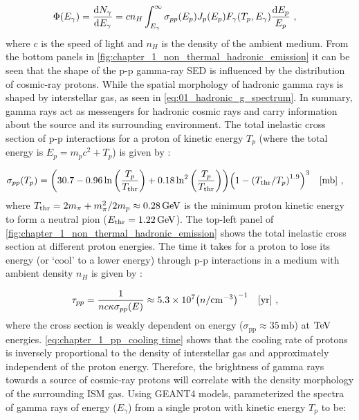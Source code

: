 \begin{equation}
    \begin{aligned}
	\Phi\qty(E_\gamma)&=\dv{N_\gamma}{E_\gamma}=cn_H\int_{E_\gamma}^\infty\sigma_{pp}\qty(E_p)J_p\qty(E_p)F_\gamma\qty(T_p,E_\gamma)\frac{\dd{E_p}}{E_p}\text{ ,}
\end{aligned} \label{eq:01_hadronic_g_spectrum}
\end{equation}
\noindent where $c$ is the speed of light and $n_H$ is the density of the ambient medium.
From the bottom panels in \autoref{fig:chapter_1_non_thermal_hadronic_emission} it can be seen that the shape of the p-p gamma-ray SED is influenced by the distribution of cosmic-ray protons. While the spatial morphology of hadronic gamma rays is shaped by interstellar gas, as seen in \autoref{eq:01_hadronic_g_spectrum}. In summary, gamma rays act as messengers for hadronic cosmic rays and carry information about the source and its surrounding environment.
\newpar
The total inelastic cross section of p-p interactions for a proton of kinetic energy $T_p$ (where the total energy is $E_p=m_pc^2+T_p$) is given by \citep{2014PhRvD..90l3014K}:

\begin{equation}
    \begin{aligned}
    \sigma_{pp}\qty(T_p) &= \qty(30.7-0.96\ln\qty(\frac{T_p}{T_\text{thr}})+0.18\ln^2\qty(\frac{T_p}{T_\text{thr}}))\qty(1-\qty(T_\text{thr}/T_p)^{1.9})^3\quad\qty[\si{\milli\barn}]\text{ ,}
    \end{aligned} \label{eq:chapter1_non_thermal_pp_cross_section}
\end{equation}
\noindent where $T_\text{thr}=2m_\pi + m_\pi^2/2m_p \approx 0.28\,\GeV$ is the minimum proton kinetic energy to form a neutral pion ($E_\text{thr}=1.22\,\GeV$). The top-left panel of \autoref{fig:chapter_1_non_thermal_hadronic_emission} shows the total inelastic cross section at different proton energies.
\newpar
The time it takes for a proton to lose its energy (or `cool' to a lower energy) through p-p interactions in a medium with ambient density $n_H$ is given by \citep{2009ARA&A..47..523H}:

\begin{equation}
    \begin{aligned}
	\tau_{pp} &= \frac{1}{nc\kappa\sigma_{pp}\qty(E)} \approx 5.3\times 10^7\qty(n/\centimeterminusthree)^{-1}\quad\qty[\si{yr}]\text{ ,}
\end{aligned} \label{eq:chapter_1_pp_cooling time}
\end{equation}
\noindent where the cross section is weakly dependent on energy ($\sigma_\text{pp}\approx 35\,\si{\milli\barn}$) at $\TeV$ energies.  \autoref{eq:chapter_1_pp_cooling time} shows that the cooling rate of protons is inversely proportional to the density of interstellar gas and approximately independent of the proton energy. Therefore, the brightness of gamma rays towards a source of cosmic-ray protons will correlate with the density morphology of the surrounding ISM gas.
\newpar 
Using GEANT4 models, \cite{2014PhRvD..90l3014K} parameterized the spectra of gamma rays of energy ($E_\gamma$) from a single proton with kinetic energy $T_p$ to be:

